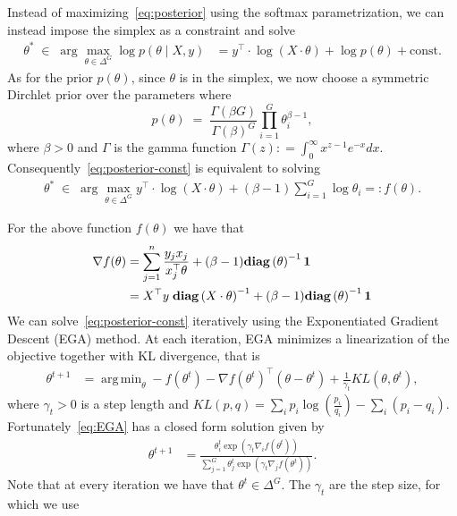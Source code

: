 \documentclass[11pt]{article}
\newcommand{\diag}[1]{\mathbf{diag}\left( #1\right)}
\newcommand{\ones}{{\bf 1}}
\DeclareMathOperator*{\argmin}{arg\,min}
\begin{document}
Instead of maximizing~\eqref{eq:posterior} using the softmax parametrization, we can instead impose the simplex as a constraint and solve
\begin{align}
\theta^* \; \in \; \arg \max_{\theta \in \Delta^G}  \log p(\theta \mid X, y) &= y^{\top} \cdot \log \left( X \cdot \theta \right)
         +\log p(\theta)+\textrm{const.} \label{eq:posterior-const}
\end{align} 
As for the prior $p(\theta)$, since $\theta$ is in the simplex, we now choose a symmetric Dirchlet  prior over the parameters where
\begin{equation}
p(\theta) \; = \; \frac{\Gamma(\beta G)}{\Gamma(\beta)^G} \prod_{i=1}^G \theta_i^{\beta -1}, 
\end{equation}
where $\beta>0$ and $\Gamma$ is the gamma function $\Gamma(z) : = \int_{0}^{\infty} x^{z-1}e^{-x}dx.$
Consequently~\eqref{eq:posterior-const} is equivalent to solving
 \begin{align}
\theta^* \; \in \; \arg \max_{\theta \in \Delta^G}   y^{\top} \cdot \log \left( X \cdot \theta \right)
         +(\beta-1)\sum_{i=1}^G\log\theta_i =: f(\theta). \label{eq:posterior-const}
\end{align} 



For the above function $f(\theta)$ we have that
\begin{align}
\nabla f(\theta) &= \sum_{j=1}^n \frac{y_j x_j}{x_j^\top \theta} + (\beta-1 ) \diag{\theta}^{-1} \ones\\
&= X^\top y \;\diag{X  \cdot\theta}^{-1}+ (\beta-1 ) \diag{\theta}^{-1} \ones
\end{align}
We can solve~\eqref{eq:posterior-const} iteratively using the Exponentiated Gradient Descent (EGA) method. At each iteration, EGA minimizes a linearization of the objective together with KL divergence, that is
\begin{align}\label{eq:EGA}
\theta^{t+1} & = \argmin_{\theta} -f(\theta^t) - \nabla f(\theta^t)^\top(\theta -\theta^t) + \frac{1}{\gamma_t} KL(\theta,\theta^t),
\end{align}
where $\gamma_t >0$ is a step length and $ KL(p,q) = \sum_i p_i \log\left(\frac{p_i}{q_i} \right)- \sum_i(p_i-q_i)$. Fortunately~\eqref{eq:EGA} has a closed form solution given by
\begin{align}\label{eq:EGAupdate}
\theta^{t+1} &=  \frac{\theta^t_i \exp( \gamma_t  \nabla_{i}f(\theta^t) )}{\sum_{j=1}^G\theta^t_j \exp( \gamma_t  \nabla_{j}f(\theta^t) ) }.
\end{align}
Note that at every iteration we have that $\theta^t \in \Delta^G.$ The $\gamma_t$ are the step size, for which we use
\end{document}
